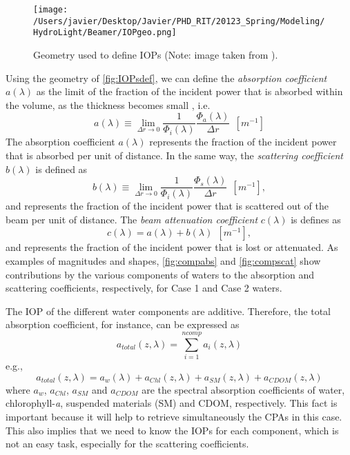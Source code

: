 \begin{figure}[htb]
\centering
\texttt{[image: /Users/javier/Desktop/Javier/PHD\_RIT/20123\_Spring/Modeling/HydroLight/Beamer/IOPgeo.png]}
\caption{Geometry used to define IOPs (Note: image taken from \citet{Mobley:2001}). \label{fig:IOPsdef} } 
\end{figure}

Using the geometry of \autoref{fig:IOPsdef}, we can define the {\it absorption coefficient}  $a(\lambda)$ as the limit of the fraction of the incident power that is absorbed within the volume, as the thickness becomes small \citep{Mobley:2001}, i.e.
\begin{equation}
  a(\lambda)\equiv \lim_{\Delta r\to 0} \frac{1}{\Phi_i(\lambda)}\frac{\Phi_a(\lambda)}{\Delta r}~~\left[m^{-1} \right]
\end{equation}
The absorption coefficient $a(\lambda)$ represents the fraction of the incident power that is absorbed per unit of distance. In the same way, the {\it scattering coefficient}  $b(\lambda)$ is defined as
\begin{equation}
  b(\lambda)\equiv \lim_{\Delta r\to 0} \frac{1}{\Phi_i(\lambda)}\frac{\Phi_s(\lambda)}{\Delta r}~~\left[m^{-1} \right],
\end{equation}
and represents the fraction of the incident power that is scattered out of the beam per unit of distance. The {\it beam attenuation coefficient}  $c(\lambda)$ is defines as
\begin{equation}
  c(\lambda)=a(\lambda)+b(\lambda)~~\left[m^{-1} \right],
\end{equation}
and represents the fraction of the incident power that is lost or attenuated. As examples of magnitudes and shapes, \autoref{fig:compabs} and \autoref{fig:compscat} show contributions by the various components of waters to the absorption and scattering coefficients, respectively, for Case 1 and Case 2 waters.

The IOP of the different water components are additive. Therefore, the total absorption coefficient, for instance, can be expressed as
\begin{equation}
  a_{total}(z,\lambda) = \sum_{i=1}^{ncomp} a_i(z,\lambda)
\end{equation}
e.g.,
\begin{equation}\label{eq:atotal}
  a_{total}(z,\lambda) =  a_w(\lambda) + a_{Chl}(z,\lambda)+a_{SM}(z,\lambda)+a_{CDOM}(z,\lambda)
\end{equation}
\noindent where $a_w$, $a_{Chl}$, $a_{SM}$ and $a_{CDOM}$ are the spectral absorption coefficients of water, chlorophyll-{\it a}, suspended materials (SM) and CDOM, respectively. This fact is important because it will help to retrieve simultaneously the CPAs in this case. This also implies that we need to know the IOPs for each component, which is not an easy task, especially for the scattering coefficients.

